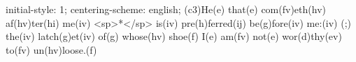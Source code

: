 initial-style: 1;
centering-scheme: english;
(c3)He(e) that(e) com(fv)eth(hv) af(hv)ter(hi) me(iv) <sp>*</sp> is(iv) pre(h)ferred(ij) be(g)fore(iv) me:(iv) (;) the(iv) latch(g)et(iv) of(g) whose(hv) shoe(f) I(e) am(fv) not(e) wor(d)thy(ev) to(fv) un(hv)loose.(f)
